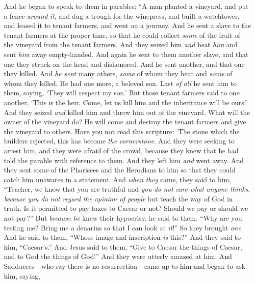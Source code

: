 \begin{biblechapter} %
 And he began to speak to them in parables: “A man planted a vineyard, and put a fence \textit{around it}, and dug a trough for the winepress, and built a watchtower, and leased it to tenant farmers, and went on a journey.
\verse And he sent a slave to the tenant farmers at the proper time, so that he could collect \textit{some} of the fruit of the vineyard from the tenant farmers.
\verse And they seized him \textit{and} beat \textit{him} and sent \textit{him} away empty-handed.
\verse And again he sent to them another slave, and that one they struck on the head and dishonored.
\verse And he sent another, and that one they killed. And \textit{he sent} many others, \textit{some} of whom they beat and \textit{some} of whom they killed.
\verse He had one more, a beloved son. Last \textit{of all} he sent him to them, saying, ‘They will respect my son.’
\verse But those tenant farmers said to one another, ‘This is the heir. Come, let us kill him and the inheritance will be ours!’
\verse And they seized \textit{and} killed him and threw him out of the vineyard.
\verse What will the owner of the vineyard do? He will come and destroy the tenant farmers and give the vineyard to others.
\verse Have you not read this scripture:
\verse ‘The stone which the builders rejected, 
this has become \textit{the cornerstone}.
\verse And they were seeking to arrest him, and they were afraid of the crowd, because they knew that he had told the parable with reference to them. And they left him \textit{and} went away.
 And they sent some of the Pharisees and the Herodians to him so that they could catch him unawares in a statement.
\verse And \textit{when they} came, they said to him, “Teacher, we know that you are truthful and \textit{you do not care what anyone thinks}, \textit{because you do not regard the opinion of people} but teach the way of God in truth. Is it permitted to pay taxes to Caesar or not? Should we pay or should we not pay?”
\verse But \textit{because he} knew their hypocrisy, he said to them, “Why are you testing me? Bring me a denarius so that I can look at \textit{it}!”
\verse So they brought \textit{one}. And he said to them, “Whose image and inscription \textit{is} this?” And they said to him, “Caesar’s.”
\verse And Jesus said to them, “Give to Caesar the things of Caesar, and to God the things of God!” And they were utterly amazed at him.
 And Sadducees—who say there is no resurrection—came up to him and began to ask him, saying,

\end{biblechapter}
